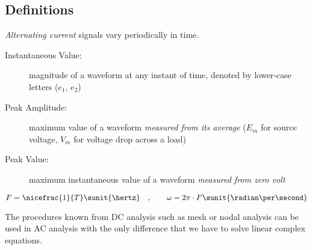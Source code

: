 
\subsection{Definitions} %
	\emph{Alternating current} signals vary periodically in time.
	
	\begin{description}
		\item[Instantaneous Value:] magnitude of a waveform at any instant of time, denoted by lower-case letters ($e_1$, $e_2$)
		\item[Peak Amplitude:] maximum value of a waveform \emph{measured from its average} ($E_m$ for source voltage, $V_m$ for voltage drop across a load)
		\item[Peak Value:] maximum instantaneous value of a waveform \emph{measured from zero volt}
	\end{description}
	
	\[
		F = \nicefrac{1}{T} \sunit{\hertz} \quad, \qquad \omega = 2\pi \cdot F \sunit{\radian\per\second}
	\]
	
	The procedures known from DC analysis such as mesh or nodal analysis can be used in AC analysis with the only difference that we have to solve linear complex equations.
